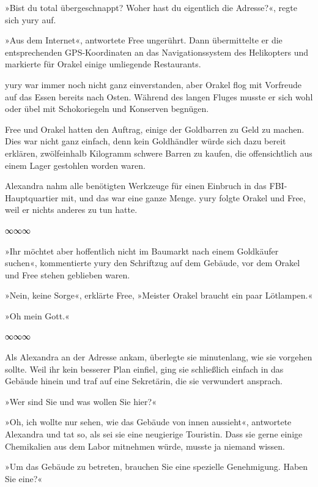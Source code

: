 »Bist du total übergeschnappt? Woher hast du eigentlich die Adresse?«, regte sich yury auf.

»Aus dem Internet«, antwortete Free ungerührt. Dann übermittelte er die entsprechenden GPS-Koordinaten an das Navigationssystem des Helikopters und markierte für Orakel einige umliegende Restaurants.

yury war immer noch nicht ganz einverstanden, aber Orakel flog mit Vorfreude auf das Essen bereits nach Osten. Während des langen Fluges musste er sich wohl oder übel mit Schokoriegeln und Konserven begnügen.

Free und Orakel hatten den Auftrag, einige der Goldbarren zu Geld zu machen. Dies war nicht ganz einfach, denn kein Goldhändler würde sich dazu bereit erklären, zwölfeinhalb Kilogramm schwere Barren zu kaufen, die offensichtlich aus einem Lager gestohlen worden waren.

Alexandra nahm alle benötigten Werkzeuge für einen Einbruch in das FBI-Hauptquartier mit, und das war eine ganze Menge. yury folgte Orakel und Free, weil er nichts anderes zu tun hatte.

\begin{center}
    ∞∞∞
\end{center}

»Ihr möchtet aber hoffentlich nicht im Baumarkt nach einem Goldkäufer suchen«, kommentierte yury den Schriftzug auf dem Gebäude, vor dem Orakel und Free stehen geblieben waren.

»Nein, keine Sorge«, erklärte Free, »Meister Orakel braucht ein paar Lötlampen.«

»Oh mein Gott.«

\begin{center}
    ∞∞∞
\end{center}

Als Alexandra an der Adresse ankam, überlegte sie minutenlang, wie sie vorgehen sollte. Weil ihr kein besserer Plan einfiel, ging sie schließlich einfach in das Gebäude hinein und traf auf eine Sekretärin, die sie verwundert ansprach.

»Wer sind Sie und was wollen Sie hier?«

»Oh, ich wollte nur sehen, wie das Gebäude von innen aussieht«, antwortete Alexandra und tat so, als sei sie eine neugierige Touristin. Dass sie gerne einige Chemikalien aus dem Labor mitnehmen würde, musste ja niemand wissen.

»Um das Gebäude zu betreten, brauchen Sie eine spezielle Genehmigung. Haben Sie eine?«

